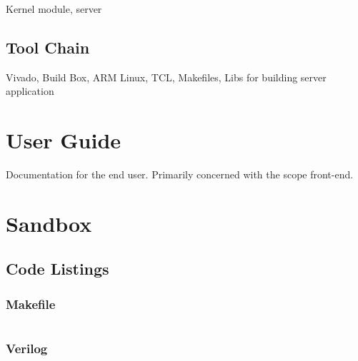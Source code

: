 \documentclass[a4paper,oneside]{alpenthesis/alpenthesis}
\begin{document}
Kernel module, server


\chapter{Tool Chain} %
\label{ch:Tool_Chain}
Vivado, Build Box, ARM Linux, TCL, Makefiles, Libs for building server application



\part{User Guide} %
\label{part:User_Guide}
Documentation for the end user. Primarily concerned with the scope front-end.


\part{Sandbox} %
\label{part:Sandbox}


\chapter{Code Listings}
\section{Makefile}
\tikzexternaldisable
\begin{tcolorbox}[
        breakable,
        title={
            \refstepcounter{listing}
            Listing \thelisting: Makefile Code
            \label{lst:makefile}
            \addcontentsline{lol}{listing}{\protect\numberline{\thelisting}Makefile Code}
        }
    ]
    \inputminted{makefile}{code/Makefile}
\end{tcolorbox}
\tikzexternalenable

\section{Verilog}
\tikzexternaldisable
\begin{tcolorbox}[
        breakable,
        width=1.2\textwidth,
        title={
            \refstepcounter{listing}
            Listing \thelisting: Verilog Code
            \label{lst:makefile}
            \addcontentsline{lol}{listing}{\protect\numberline{\thelisting}Verilog Code}
        }
    ]
\inputminted{verilog}{code/axi_axis_reader.v}
\end{tcolorbox}
\tikzexternalenable
\end{document}
